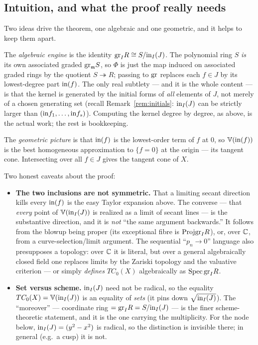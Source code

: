 \documentclass[11pt]{article}
\begin{document}
\subsection*{Intuition, and what the proof really needs}

Two ideas drive the theorem, one algebraic and one geometric, and it helps to keep them apart.

The \emph{algebraic engine} is the identity $\text{gr}_I R \cong S/\text{in}_I(J)$. The polynomial ring $S$ \emph{is} its own associated graded $\text{gr}_{\operatorname{\mathfrak{m}}} S$, so $\Phi$ is just the map induced on associated graded rings by the quotient $S \twoheadrightarrow R$; passing to $\text{gr}$ replaces each $f \in J$ by its lowest-degree part $\text{in}(f)$. The only real subtlety --- and it is the whole content --- is that the kernel is generated by the initial forms of \emph{all} elements of $J$, not merely of a chosen generating set (recall Remark~\ref{rem:initials}: $\text{in}_I(J)$ can be strictly larger than $(\text{in} f_1, \ldots, \text{in} f_s)$). Computing the kernel degree by degree, as above, is the actual work; the rest is bookkeeping.

The \emph{geometric picture} is that $\text{in}(f)$ is the lowest-order term of $f$ at $0$, so $\mathbb V(\text{in}(f))$ is the best homogeneous approximation to $\{f=0\}$ at the origin --- its tangent cone. Intersecting over all $f \in J$ gives the tangent cone of $X$.

Two honest caveats about the proof:
\begin{itemize}[topsep=2pt,itemsep=3pt]
    \item \textbf{The two inclusions are not symmetric.} That a limiting secant direction kills every $\text{in}(f)$ is the easy Taylor expansion above. The converse --- that \emph{every} point of $\mathbb V(\text{in}_I(J))$ is realized as a limit of secant lines --- is the substantive direction, and it is \emph{not} ``the same argument backwards.'' It follows from the blowup being proper (its exceptional fibre is $\text{Proj} \text{gr}_I R$), or, over $\mathbb C$, from a curve-selection/limit argument. The sequential ``$p_n \to 0$'' language also presupposes a topology: over $\mathbb C$ it is literal, but over a general algebraically closed field one replaces limits by the Zariski topology and the valuative criterion --- or simply \emph{defines} $TC_0(X)$ algebraically as $\operatorname{Spec} \text{gr}_I R$.
    \item \textbf{Set versus scheme.} $\text{in}_I(J)$ need not be radical, so the equality $TC_0(X) = \mathbb V(\text{in}_I(J))$ is an equality of \emph{sets} (it pins down $\sqrt{\text{in}_I(J)}$). The ``moreover'' --- coordinate ring $= \text{gr}_I R = S/\text{in}_I(J)$ --- is the finer scheme-theoretic statement, and it is the one carrying the multiplicity. For the node below, $\text{in}_I(J) = (y^2 - x^2)$ is radical, so the distinction is invisible there; in general (e.g.\ a cusp) it is not.
\end{itemize}
\end{document}
